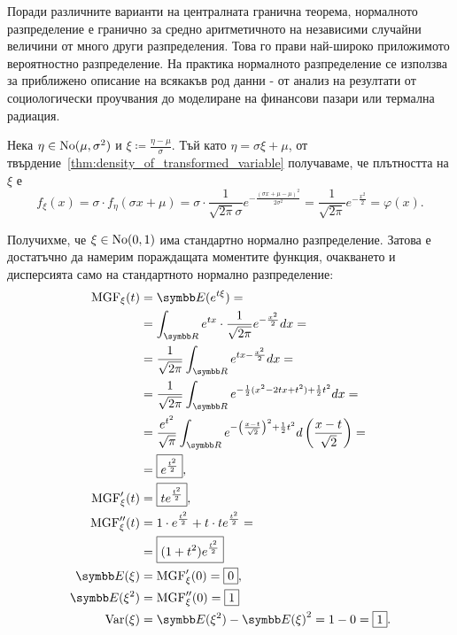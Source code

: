 \documentclass[numbers=endperiod, bibliography=totocnumbered]{scrartcl}
\begin{document}
Поради различните варианти на централната гранична теорема, нормалното разпределение е гранично за средно аритметичното на независими случайни величини от много други разпределения. Това го прави най-широко приложимото вероятностно разпределение. На практика нормалното разпределение се използва за приближено описание на всякакъв род данни - от анализ на резултати от социологически проучвания до моделиране на финансови пазари или термална радиация.

Нека \( \eta \in \operatorname{No}(\mu, \sigma^2) \) и \( \xi \coloneqq \frac {\eta - \mu} \sigma \). Тъй като \( \eta = \sigma \xi + \mu \), от твърдение~\ref{thm:density_of_transformed_variable} получаваме, че плътността на \( \xi \) е
\begin{equation*}
  f_\xi(x)
  =
  \sigma \cdot f_\eta(\sigma x + \mu)
  =
  \sigma \cdot \frac 1 {\sqrt{2\pi} \sigma} e^{-\frac{{(\sigma x + \mu -\mu)}^2} {2\sigma^2}}
  =
  \frac 1 {\sqrt{2\pi}} e^{-\frac {x^2} 2}
  =
  \varphi(x).
\end{equation*}

Получихме, че \( \xi \in \operatorname{No}(0, 1) \) има стандартно нормално разпределение. Затова е достатъчно да намерим пораждащата моментите функция, очакването и дисперсията само на стандартното нормално разпределение:
\begingroup
\allowdisplaybreaks
\begin{align*}
  \MGF_\xi(t)
  &=
  \Expect(e^{t\xi})
  = \\ &=
  \int_{\R} e^{tx} \cdot \frac 1 {\sqrt{2\pi}} e^{-\frac {x^2} 2} dx
  = \\ &=
  \frac 1 {\sqrt{2\pi}} \int_{\R} e^{tx -\frac {x^2} 2} dx
  = \\ &=
  \frac 1 {\sqrt{2\pi}} \int_{\R} e^{- \frac 1 2 (x^2 - 2tx + t^2) + \frac 1 2 t^2} dx
  = \\ &=
  \frac {e^{t^2}} {\sqrt \pi} \int_{\R} e^{- {\left(\frac {x - t} {\sqrt 2} \right)}^2 + \frac 1 2 t^2} d\left( \frac {x - t} {\sqrt 2} \right)
  = \\ &=
  \boxed{e^{\frac {t^2} 2}},
  \\
  \MGF'_\xi(t)
  &=
  \boxed{t e^{\frac {t^2} 2}},
  \\
  \MGF''_\xi(t)
  &=
  1 \cdot e^{\frac {t^2} 2} + t \cdot t e^{\frac {t^2} 2}
  = \\ &=
  \boxed{(1 + t^2) e^{\frac {t^2} 2}}
  \\
  \Expect(\xi)
  &=
  \MGF'_\xi(0)
  =
  \boxed{0},
  \\
  \Expect(\xi^2)
  &=
  \MGF''_\xi(0)
  =
  \boxed{1}
  \\
  \Var(\xi)
  &=
  \Expect(\xi^2) - {\Expect(\xi)}^2
  =
  1 - 0
  =
  \boxed{1}.
\end{align*}
\endgroup
\end{document}
